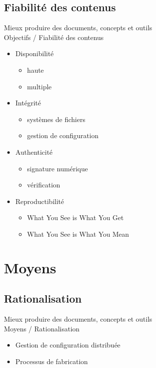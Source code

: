\documentclass{beamer}
\def\hititle{Mieux produire des documents}
\def\lotitle{concepts et outils}
\def\fulltitle{\hititle, \lotitle}
\begin{document}
\subsection{Fiabilité des contenus}
\begin{frame}{\fulltitle\\Objectifs / Fiabilité des contenus}
\begin{itemize}
\item<1-> Disponibilité
    \begin{itemize}
    \item<2-> haute
    \item<3-> multiple
    \end{itemize}
\item<4-> Intégrité
    \begin{itemize}
    \item<5-> systèmes de fichiers
    \item<6-> gestion de configuration
    \end{itemize}
\item<7-> Authenticité
    \begin{itemize}
    \item<8-> signature numérique
    \item<9-> vérification
    \end{itemize}
\item<10-> Reproductibilité
    \begin{itemize}
    \item<11-> What You See is What You Get
    \item<12-> What You See is What You Mean
    \end{itemize}
\end{itemize}
\end{frame}
\section{Moyens}
\subsection{Rationalisation}
\begin{frame}{\fulltitle\\Moyens / Rationalisation}
\begin{itemize}
\item<1-> Gestion de configuration distribuée
\item<2-> Processus de fabrication
\end{itemize}
\end{frame}
\end{document}
